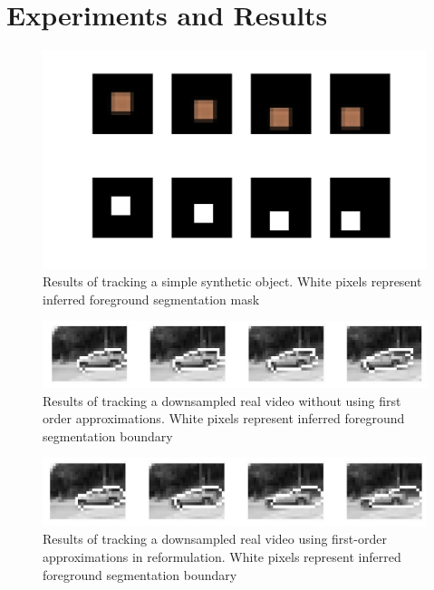 \section{Experiments and Results}
\label{sec:Expt}

\begin{figure}[!t]
\begin{center}
	\includegraphics[scale=0.35]{figures/easy_square_tracking.jpg}
	\caption{Results of tracking a simple synthetic object. White pixels represent inferred foreground segmentation mask}
	\label{fig:trackSquare}
\end{center}
\end{figure}

\begin{figure}[!t]
\begin{center}
	\includegraphics[scale=0.35]{figures/car_tracking.jpg}
	\caption{Results of tracking a downsampled real video without using first order approximations. White pixels represent inferred foreground segmentation boundary}
	\label{fig:trackCar}
\end{center}
\end{figure}

\begin{figure}[!t]
\begin{center}
	\includegraphics[scale=0.35]{figures/horn_schunk_car_tracking.jpg}
	\caption{Results of tracking a downsampled real video using first-order approximations in reformulation. White pixels represent inferred foreground segmentation boundary}
	\label{fig:HStrackCar}
\end{center}
\end{figure}

